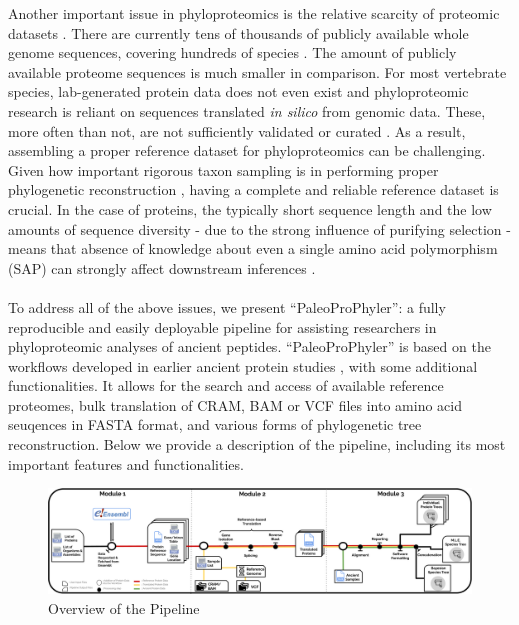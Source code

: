 \documentclass[twocolumn,showpacs,%
  nofootinbib,aps,superscriptaddress,%
  eqsecnum,prd,notitlepage,showkeys,10pt]{report}
\begin{document}
Another important issue in phyloproteomics is the relative scarcity of proteomic datasets \cite{muller2020proteome,brandt2022palaeoproteomics}. There are currently tens of thousands of publicly available whole genome sequences, covering hundreds of species \cite{lewin2018earth,byrskahigh,prado2013great,zhang2014comparative,koepfli2015genome}. The amount of publicly available proteome sequences is much smaller in comparison. For most vertebrate species, lab-generated protein data does not even exist and phyloproteomic research is reliant on sequences translated \textit{in silico} from genomic data. These, more often than not, are not sufficiently validated or curated \cite{bagheri2020detecting}. As a result, assembling a proper reference dataset for phyloproteomics can be challenging. Given how important rigorous taxon sampling is in performing proper phylogenetic reconstruction \cite{rosenberg2003taxon,heath2008taxon}, having a complete and reliable reference dataset is crucial. In the case of proteins, the typically short sequence length and the low amounts of sequence diversity - due to the strong influence of purifying selection - means that absence of knowledge about even a single amino acid polymorphism (SAP) can strongly affect downstream inferences \cite{opperdoes2003phylogenetic,presslee2019data,demarchi2022ancient,chen2019late}. 


\paragraph{}

To address all of the above issues,  we present “PaleoProPhyler”: a fully reproducible and easily deployable pipeline for assisting researchers in phyloproteomic analyses of ancient peptides. “PaleoProPhyler” is based on the workflows developed in earlier ancient protein studies \cite{cappellini2019early,welker2019enamel,welker2020dental}, with some additional functionalities. It allows for the search and access of available reference proteomes, bulk translation of CRAM, BAM or VCF files into amino acid seuqences in FASTA format, and various forms of phylogenetic tree reconstruction. Below we provide a description of the pipeline, including its most important features and functionalities.

\begin{figure}[h!]
\centering
\includegraphics[scale=0.21]{graphics/PaleoProPhyler_Overview_Fig.png}
\caption{Overview of the Pipeline }
\label{fig:Overview}
\end{figure}
\end{document}
